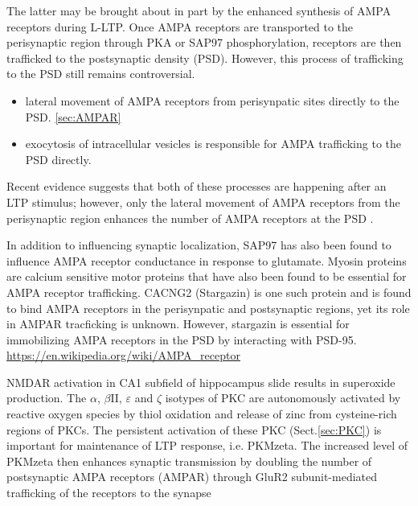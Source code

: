   The latter may be brought about in part by the enhanced synthesis of AMPA
  receptors during L-LTP.
  Once AMPA receptors are transported to the perisynaptic region through PKA or
  SAP97 phosphorylation, receptors are then trafficked to the postsynaptic
  density (PSD).
  However, this process of trafficking to the PSD still remains controversial.
  \begin{itemize}
    \item lateral movement of AMPA receptors from perisynpatic sites directly to
    the PSD. \citep{borgdorff2002} \ref{sec:AMPAR}

    \item  exocytosis of intracellular vesicles is responsible for AMPA
    trafficking to the PSD directly. \citep{park2004re}
  \end{itemize}
  Recent evidence suggests that both of these processes are happening after an
  LTP stimulus; however, only the lateral movement of AMPA receptors from the
  perisynaptic region enhances the number of AMPA receptors at the PSD
  \citep{makino2009}.
  
  In addition to influencing synaptic localization, SAP97 has also been found to
  influence AMPA receptor conductance in response to glutamate.
  Myosin proteins are calcium sensitive motor proteins that have also been found
  to be essential for AMPA receptor trafficking. 
  CACNG2 (Stargazin) is one such protein and is found to bind AMPA receptors in
  the perisynpatic and postsynaptic regions, yet its role in AMPAR tracficking
  is unknown. 
  However, stargazin is essential for immobilizing AMPA receptors in the PSD by
  interacting with PSD-95.
  \url{https://en.wikipedia.org/wiki/AMPA_receptor}

  NMDAR activation in CA1 subfield of hippocampus slide results in superoxide
  production. The $\alpha$, $\beta$II, $\varepsilon$ and $\zeta$ isotypes of PKC
  are autonomously activated by reactive oxygen species by thiol oxidation and
  release of zinc from cysteine-rich regions of PKCs. The persistent activation
  of these PKC (Sect.\ref{sec:PKC}) is important for maintenance of LTP
  response, i.e. PKMzeta. The increased level of PKMzeta then enhances synaptic
  transmission by doubling the number of postsynaptic AMPA receptors (AMPAR)
  through GluR2 subunit-mediated trafficking of the receptors to the synapse
  \citep{sacktor2008}


